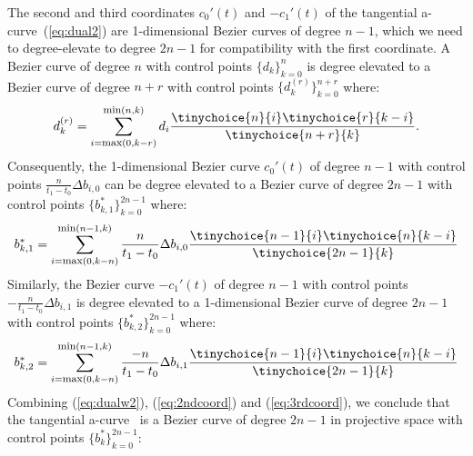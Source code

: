 \documentclass[12pt]{article}
\newcommand{\atang}{tangential a-curve\ }
\begin{document}
The second and third coordinates $c_0'(t)$ and $-c_1'(t)$
of the \atang (\ref{eq:dual2}) are 1-dimensional Bezier curves of degree $n-1$,
which we need to degree-elevate to degree $2n-1$
for compatibility with the first coordinate.
A Bezier curve of degree $n$ with control points $\{ d_k \}_{k=0}^n$ 
is degree elevated \cite{farin97} to a Bezier curve of degree $n+r$ with control points
$\{ d_k^{(r)} \}_{k=0}^{n+r}$ where:
\[
d_k^{(r)} = \sum_{i=\mbox{\footnotesize{max}}(0,k-r)}^{\mbox{\footnotesize{min}}(n,k)} 
		d_i \frac{\tinychoice{n}{i} \tinychoice{r}{k-i} }{ \tinychoice{n+r}{k} }.
\]
%
Consequently, the 1-dimensional Bezier curve $c_0'(t)$ 
of degree $n-1$ with control points $\frac{n}{t_1-t_0} \Delta b_{i,0}$ 
can be degree elevated to a Bezier curve of degree $2n-1$ with control points 
$\{b^*_{k,1} \}_{k=0}^{2n-1}$ where:
\begin{equation}
\label{eq:2ndcoord}
b^*_{k,1} = 
\sum_{i=\mbox{\footnotesize{max}}(0,k-n)}^{\mbox{\footnotesize{min}}(n-1,k)} 
	\frac{n}{t_1-t_0} \Delta b_{i,0}
	\frac{ \tinychoice{n-1}{i} \tinychoice{n}{k-i} }{ \tinychoice{2n-1}{k} }
\end{equation}
%
Similarly, the Bezier curve $-c_1'(t)$
of degree $n-1$ with control points $-\frac{n}{t_1-t_0} \Delta b_{i,1}$
is degree elevated to a 1-dimensional Bezier curve of degree $2n-1$
with control points $\{b^*_{k,2} \}_{k=0}^{2n-1}$ where:
\begin{equation}
\label{eq:3rdcoord}
b^*_{k,2} = 
\sum_{i=\mbox{\footnotesize{max}}(0,k-n)}^{\mbox{\footnotesize{min}}(n-1,k)} 
	\frac{-n}{t_1-t_0} \Delta b_{i,1}
	\frac{ \tinychoice{n-1}{i} \tinychoice{n}{k-i} }{ \tinychoice{2n-1}{k} }
\end{equation}
%
Combining (\ref{eq:dualw2}), (\ref{eq:2ndcoord}) and (\ref{eq:3rdcoord}),
we conclude that the \atang
is a Bezier curve of degree $2n-1$ in projective space with control points 
$\{b^*_k\}_{k=0}^{2n-1}$:
\end{document}

